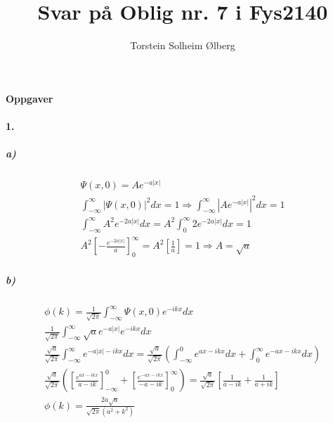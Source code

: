 \documentclass[11pt, A4paper,norsk]{article}
\author{Torstein Solheim Ølberg}
\title{Svar på Oblig nr. 7 i Fys2140}
\begin{document}
\maketitle
	\begin{center}
\Large \textbf{Oppgaver}
	\end{center}









		\paragraph{1.}
			\subparagraph{a)}
				\begin{gather*}
\Psi(x, 0) = Ae^{- a |x|} \\
\int_{- \infty}^{\infty} |\Psi(x, 0)|^2 dx = 1 \Rightarrow \int_{- \infty}^{\infty} \left|Ae^{- a |x|}\right|^2 dx = 1 \\
\int_{- \infty}^{\infty} A^2 e^{- 2 a |x|} dx = A^2 \int_{0}^{\infty} 2 e^{- 2 a |x|} dx = 1 \\
A^2 \left[ - \frac{e^{-2a |x|}}{a} \right]_{0}^{\infty} = A^2 \left[ \frac{1}{a} \right] = 1 \Rightarrow A = \sqrt{a}
				\end{gather*}









			\subparagraph{b)}
				\begin{gather*}
\phi(k) = \frac{1}{\sqrt{2 \pi}} \int_{- \infty}^{\infty} \Psi(x, 0) e^{- i k x} dx \\
\frac{1}{\sqrt{2 \pi}} \int_{- \infty}^{\infty} \sqrt{a} e^{- a |x|} e^{- i k x} dx \\
\frac{\sqrt{a}}{\sqrt{2 \pi}} \int_{- \infty}^{\infty} e^{- a |x| - i k x} dx = \frac{\sqrt{a}}{\sqrt{2 \pi}} \left( \int_{- \infty}^{0} e^{a x - i k x} dx + \int_{0}^{\infty} e^{- a x - i k x} dx \right) \\
\frac{\sqrt{a}}{\sqrt{2 \pi}} \left( \left[ \frac{e^{a x - i k x}}{a - ik} \right]_{- \infty}^{0} + \left[ \frac{e^{- a x - i k x}}{- a - ik} \right]_{0}^{\infty} \right) = \frac{\sqrt{a}}{\sqrt{2 \pi}} \left[ \frac{1}{a - ik} + \frac{1}{a + ik} \right] \\
\phi(k) = \frac{2 a \sqrt{a}}{\sqrt{2 \pi} (a^2 + k^2)}
				\end{gather*}
\end{document}
